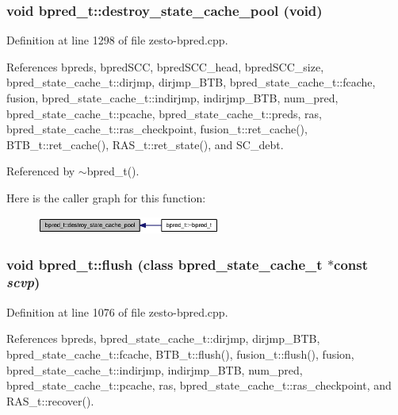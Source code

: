 \subsubsection[{destroy\_\-state\_\-cache\_\-pool}]{\setlength{\rightskip}{0pt plus 5cm}void bpred\_\-t::destroy\_\-state\_\-cache\_\-pool (void)\hspace{0.3cm}{\tt  [private]}}\label{classbpred__t_2cc9b44a57aa40da4430f0b3598d3d53}




Definition at line 1298 of file zesto-bpred.cpp.

References bpreds, bpredSCC, bpredSCC\_\-head, bpredSCC\_\-size, bpred\_\-state\_\-cache\_\-t::dirjmp, dirjmp\_\-BTB, bpred\_\-state\_\-cache\_\-t::fcache, fusion, bpred\_\-state\_\-cache\_\-t::indirjmp, indirjmp\_\-BTB, num\_\-pred, bpred\_\-state\_\-cache\_\-t::pcache, bpred\_\-state\_\-cache\_\-t::preds, ras, bpred\_\-state\_\-cache\_\-t::ras\_\-checkpoint, fusion\_\-t::ret\_\-cache(), BTB\_\-t::ret\_\-cache(), RAS\_\-t::ret\_\-state(), and SC\_\-debt.

Referenced by $\sim$bpred\_\-t().

Here is the caller graph for this function:\nopagebreak
\begin{figure}[H]
\begin{center}
\leavevmode
\includegraphics[width=171pt]{classbpred__t_2cc9b44a57aa40da4430f0b3598d3d53_icgraph}
\end{center}
\end{figure}
\subsubsection[{flush}]{\setlength{\rightskip}{0pt plus 5cm}void bpred\_\-t::flush (class {\bf bpred\_\-state\_\-cache\_\-t} $\ast$const  {\em scvp})}\label{classbpred__t_5e29cd0982fcca98f66db5f4cc11321a}




Definition at line 1076 of file zesto-bpred.cpp.

References bpreds, bpred\_\-state\_\-cache\_\-t::dirjmp, dirjmp\_\-BTB, bpred\_\-state\_\-cache\_\-t::fcache, BTB\_\-t::flush(), fusion\_\-t::flush(), fusion, bpred\_\-state\_\-cache\_\-t::indirjmp, indirjmp\_\-BTB, num\_\-pred, bpred\_\-state\_\-cache\_\-t::pcache, ras, bpred\_\-state\_\-cache\_\-t::ras\_\-checkpoint, and RAS\_\-t::recover().

